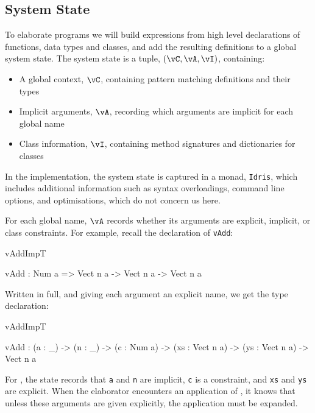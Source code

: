 


\subsection{System State}

\label{sect:sysstate}

To elaborate \Idris{} programs we will build expressions from high level
declarations of functions, data types and classes, and add the resulting
definitions to a global system state.
The system state is a tuple, $(\vC,\vA,\vI)$, containing:

\begin{itemize}
\item A global context, $\vC$, containing pattern matching definitions and their types
\item Implicit arguments, $\vA$, recording which arguments are implicit for each global name
\item Class information, $\vI$, containing method signatures and dictionaries for classes
\end{itemize}

In the implementation, the system state is captured in a monad, \texttt{Idris},
which includes additional information such as syntax overloadings, command line
options, and optimisations, which do not concern us here. 

For each global name, $\vA$ records whether its arguments are explicit, implicit,
or class constraints.  For example, recall the declaration
of \texttt{vAdd}:

\begin{SaveVerbatim}{vAddImpT}

vAdd : Num a => Vect n a -> Vect n a -> Vect n a

\end{SaveVerbatim}

\noindent
Written in full, and giving each argument an explicit name, we get the
type declaration:

\begin{SaveVerbatim}{vAddImpT}

vAdd : (a : _) -> (n : _) -> (c : Num a) -> 
       (xs : Vect n a) -> (ys : Vect n a) -> Vect n a

\end{SaveVerbatim}

\noindent
For , the state records that \texttt{a} and \texttt{n} are implicit, 
\texttt{c} is a constraint, and \texttt{xs} and \texttt{ys} are explicit. When
the elaborator encounters an application of , it knows that unless these arguments
are given explicitly, the application must be expanded.

